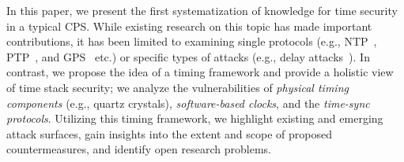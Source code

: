     
\iffalse
\begin{figure*}[ht]
    \small
    \centering
    \begin{subfigure}{0.34\textwidth}
        \centering    
        \texttt{[image: figures/time-stack-updated.pdf]}
        \caption{}
        \label{fig:time-stack-example}
    \end{subfigure}
    \begin{subfigure}{0.32\textwidth}
        \centering   
        \texttt{[image: figures/two-way-transfer.pdf]}
        \caption{}
        \label{fig:two-way}
    \end{subfigure}
    \begin{subfigure}{0.32\textwidth}
        \centering 
        \texttt{[image: figures/one-way-transfer.pdf]}
        \caption{}
        \label{fig:one-way}
    \end{subfigure}
    \caption{a) Time stack in a modern CPS. b) Two-way time synchronization. c) One-way time synchronization.}
    \label{fig:sync-paradigms}
\end{figure*}
\fi

In this paper, we present the first systematization of knowledge for time security in a typical CPS. While existing research on this topic has made important contributions, it has been limited to examining single protocols (e.g., NTP~\cite{ntp-replay-drop-attack, shark-ntp-pool, theory-nts-specs}, PTP~\cite{ptp-futile-encryption, net-sync-ptp-sec, net-sync-ptp-covert-channel}, and GPS~\cite{gps-spoofing-fundamentals, gps-anti-jamming-post-correlation, gps-anti-jamming-post-wavelet, gps-anti-spoofing-static} etc.) or specific types of attacks (e.g., delay attacks~\cite{ptp-futile-encryption, multi-path-game-theory}). In contrast, we propose the idea of a timing framework and provide a holistic view of time stack security; we analyze the vulnerabilities of \textit{physical timing components} (e.g., quartz crystals), \textit{software-based clocks}, and the \textit{time-sync protocols}. Utilizing this timing framework, we highlight existing and emerging attack surfaces, gain insights into the extent and scope of proposed countermeasures, and identify open research problems.

